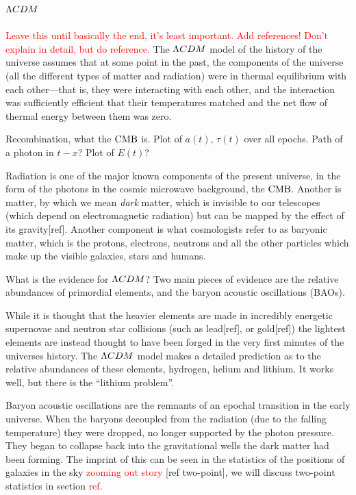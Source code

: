     \subsection{$\Lambda CDM$}
    \textcolor{red}{Leave this until basically the end, it's least important.
        Add references! Don't explain in detail, but do reference.}
    The $\Lambda CDM$ model of the history of the universe assumes that at some point in the
    past, the components of the universe (all the different types of matter and radiation)
    were in thermal equilibrium with each other---that is, they were interacting with each other,
    and the interaction was sufficiently efficient that their temperatures matched
    and the net flow of thermal energy between them was zero.


    Recombination, what the $\text{CMB}$ is.
    Plot of $a(t)$, $\tau(t)$ over all epochs.
    Path of a photon in $t-x$? Plot of $E(t)$?


    Radiation is one of the major known components of the present universe, in the form of the
    photons in the cosmic microwave background, the $\text{CMB}$. Another is matter, by which we mean \textit{dark} matter,
    which is invisible to our telescopes (which depend on electromagnetic radiation) but can be mapped by the
    effect of its gravity[ref]. Another component is what cosmologists refer to as baryonic matter, which is
    the protons, electrons, neutrons and all the other particles which make up the visible galaxies, stars
    and humans.


    What is the evidence for $\Lambda CDM$? Two main pieces of evidence are the relative abundances of
    primordial elements, and the baryon acoustic oscillations (BAOs).


    While it is thought that the heavier elements are made in incredibly energetic supernovae and
    neutron star collisions (such as lead[ref], or gold[ref]) the lightest elements are instead thought to have been forged in the
    very first minutes of the universes history. The $\Lambda CDM$ model makes a detailed prediction as to the
    relative abundances of these elements, hydrogen, helium and lithium. It works well, but there is
    the ``lithium problem''.


    Baryon acoustic oscillations are the remnants of an epochal transition in the early universe.
    When the baryons decoupled from the radiation (due to the falling temperature) they were dropped,
    no longer supported by the photon pressure. They began to collapse back into the gravitational
    wells the dark matter had been forming. The imprint of this can be seen in the statistics
    of the positions of galaxies in the sky \textcolor{red}{zooming out story} [ref two-point],
    we will discuss two-point statistics in
    section \textcolor{red}{ref}.


